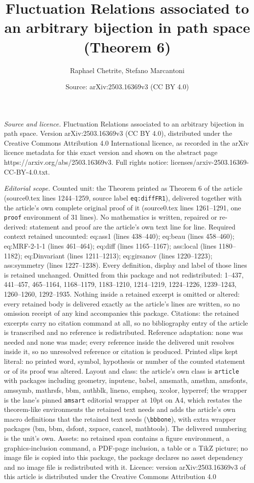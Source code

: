 \documentclass[10pt,a4paper]{amsart}
\title[Fluctuation Relations associated to an arbitrary bijection i]{Fluctuation Relations associated to an arbitrary bijection in path space (Theorem 6)}
\author{Raphael Chetrite, Stefano Marcantoni}
\date{Source: arXiv:2503.16369v3 (CC BY 4.0)}
\begin{document}
\maketitle

\noindent\emph{Source and licence.} Fluctuation Relations associated to an arbitrary bijection in path space. Version arXiv:2503.16369v3 (CC BY 4.0), distributed under the Creative Commons Attribution 4.0 International licence, as recorded in the arXiv licence metadata for this exact version and shown on the abstract page https://arxiv.org/abs/2503.16369v3. Full rights notice: licenses/arxiv-2503.16369-CC-BY-4.0.txt.\par\smallskip

\noindent\textit{Editorial scope.} Counted unit: the Theorem printed as Theorem 6 of the article (source0.tex lines 1244--1259, source label \texttt{eq:diffFR1}), delivered together with the article's own complete original proof of it (source0.tex lines 1261--1291, one \texttt{proof} environment of 31 lines). No mathematics is written, repaired or re-derived: statement and proof are the article's own text line for line. Required context retained uncounted: eq:ass1 (lines 438--440); eq:beau (lines 458--460); eq:MRF-2-1-1 (lines 461--464); eq:diff (lines 1165--1167); ass:local (lines 1180--1182); eq:Dinvariant (lines 1211--1213); eq:girsanov (lines 1220--1223); ass:symmetry (lines 1227--1238). Every definition, display and label of those lines is retained unchanged. Omitted from this package and not redistributed: 1--437, 441--457, 465--1164, 1168--1179, 1183--1210, 1214--1219, 1224--1226, 1239--1243, 1260--1260, 1292--1935. Nothing inside a retained excerpt is omitted or altered: every retained body is delivered exactly as the article's lines are written, so no omission receipt of any kind accompanies this package. Citations: the retained excerpts carry no citation command at all, so no bibliography entry of the article is transcribed and no reference is redistributed. Reference adaptation: none was needed and none was made; every reference inside the delivered unit resolves inside it, so no unresolved reference or citation is produced. Printed slips kept literal: no printed word, symbol, hypothesis or number of the counted statement or of its proof was altered. Layout and class: the article's own class is \texttt{article} with packages including geometry, inputenc, babel, amsmath, amsthm, amsfonts, amssymb, mathrsfs, bbm, authblk, lineno, empheq, xcolor, hyperref; the wrapper is the lane's pinned \texttt{amsart} editorial wrapper at 10pt on A4, which restates the theorem-like environments the retained text needs and adds the article's own macro definitions that the retained text needs (\texttt{\textbackslash bbbone}), with extra wrapper packages (bm, bbm, dsfont, xspace, cancel, mathtools). The delivered numbering is the unit's own. Assets: no retained span contains a figure environment, a graphics-inclusion command, a PDF-page inclusion, a table or a TikZ picture; no image file is copied into this package, the package declares no asset dependency and no image file is redistributed with it. Licence: version arXiv:2503.16369v3 of this article is distributed under the Creative Commons Attribution 4.0 
\end{document}
